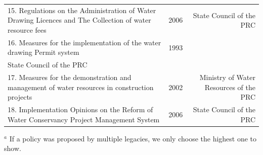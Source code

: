 \documentclass[9pt,twoside,lineno]{pnas-new}
\begin{document}
\begin{table}
\begin{tabular}{lrr}
    15. Regulations on the Administration of Water Drawing Licences and The Collection of water resource fees & 2006 & State Council of the PRC \\
    16. Measures for the implementation of the water drawing Permit system & 1993 \\ State Council of the PRC \\
    17. Measures for the demonstration and management of water resources in construction projects & 2002 & Ministry of Water Resources of the PRC \\
    18. Implementation Opinions on the Reform of Water Conservancy Project Management System & 2006 & State Council of the PRC \\

    \bottomrule
    \end{tabular}

    \footnotesize{$^a$ If a policy was proposed by multiple legacies, we only choose the highest one to show.}
\end{table}



\FloatBarrier




\end{document}
